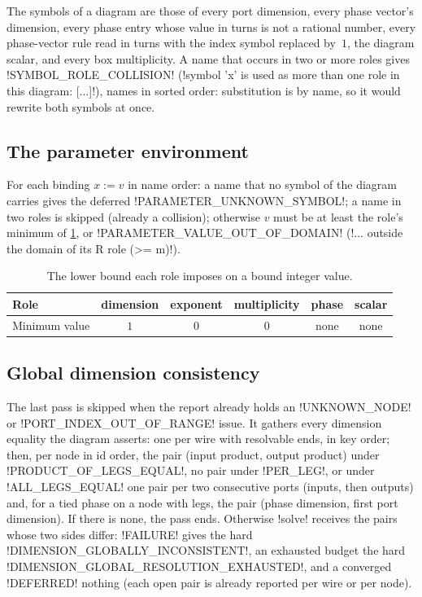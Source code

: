 The symbols of a diagram are those of every port dimension, every phase vector's dimension, every phase entry whose value in turns is not a rational number, every phase-vector rule read in turns with the index symbol replaced by~$1$, the diagram scalar, and every box multiplicity. A name that occurs in two or more roles gives \code!SYMBOL_ROLE_COLLISION! (\code!symbol 'x' is used as more than one role in this diagram: [...]!), names in sorted order: substitution is by name, so it would rewrite both symbols at once.

\subsection{The parameter environment}\label{sec:diagrams-validate-params}

For each binding $x:=v$ in name order: a name that no symbol of the diagram carries gives the deferred \code!PARAMETER_UNKNOWN_SYMBOL!; a name in two roles is skipped (already a collision); otherwise $v$ must be at least the role's minimum of \cref{tab:diagrams-role-min}, or \code!PARAMETER_VALUE_OUT_OF_DOMAIN! (\code!... outside the domain of its R role (>= m)!).

\begin{table}[H]
\centering\small
\begin{tabular}{@{}lccccc@{}}
\toprule
Role & dimension & exponent & multiplicity & phase & scalar \\
\midrule
Minimum value & $1$ & $0$ & $0$ & none & none \\
\bottomrule
\end{tabular}
\caption{The lower bound each role imposes on a bound integer value.}
\label{tab:diagrams-role-min}
\end{table}

\subsection{Global dimension consistency}\label{sec:diagrams-validate-global}

The last pass is skipped when the report already holds an \code!UNKNOWN_NODE! or \code!PORT_INDEX_OUT_OF_RANGE! issue. It gathers every dimension equality the diagram asserts: one per wire with resolvable ends, in key order; then, per node in id order, the pair (input product, output product) under \code!PRODUCT_OF_LEGS_EQUAL!, no pair under \code!PER_LEG!, or under \code!ALL_LEGS_EQUAL! one pair per two consecutive ports (inputs, then outputs) and, for a tied phase on a node with legs, the pair (phase dimension, first port dimension). If there is none, the pass ends. Otherwise \py!solve! receives the pairs whose two sides differ: \code!FAILURE! gives the hard \code!DIMENSION_GLOBALLY_INCONSISTENT!, an exhausted budget the hard \code!DIMENSION_GLOBAL_RESOLUTION_EXHAUSTED!, and a converged \code!DEFERRED! nothing (each open pair is already reported per wire or per node).

